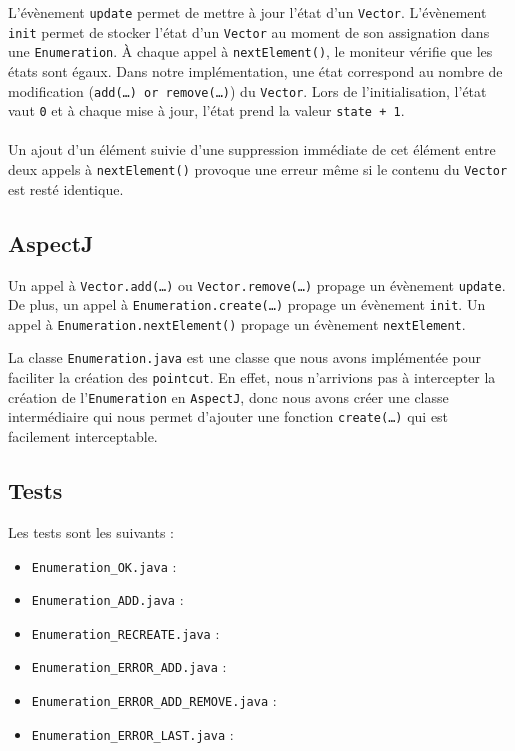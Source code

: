 \documentclass{article}
\begin{document}
L'évènement \texttt{update} permet de mettre à jour l'état d'un \texttt{Vector}.
L'évènement \texttt{init} permet de stocker l'état d'un \texttt{Vector} au
moment de son assignation dans une \texttt{Enumeration}. À chaque appel à
\texttt{nextElement()}, le moniteur vérifie que les états sont égaux. Dans notre
implémentation, une état correspond au nombre de modification
(\texttt{add(\ldots) or \texttt{remove(\ldots)}}) du \texttt{Vector}. Lors de
l'initialisation, l'état vaut \texttt{0} et à chaque mise à jour, l'état prend
la valeur \texttt{state + 1}.

\paragraph{\danger} Un ajout d'un élément suivie d'une suppression immédiate de
cet élément entre deux appels à \texttt{nextElement()} provoque une erreur même
si le contenu du \texttt{Vector} est resté identique.

\subsection{AspectJ}

Un appel à \texttt{Vector.add(\ldots)} ou \texttt{Vector.remove(\ldots)} propage
un évènement \texttt{update}. De plus, un appel à
\texttt{Enumeration.create(\ldots)} propage un évènement \texttt{init}. Un appel à \texttt{Enumeration.nextElement()}
propage un évènement \texttt{nextElement}.

\vspace{0.3cm}

La classe \texttt{Enumeration.java} est une classe que nous avons implémentée
pour faciliter la création des \texttt{pointcut}. En effet, nous n'arrivions pas
à intercepter la création de l'\texttt{Enumeration} en \texttt{AspectJ}, donc
nous avons créer une classe intermédiaire qui nous permet d'ajouter une fonction
\texttt{create(\ldots)} qui est facilement interceptable.

\subsection{Tests}

Les tests sont les suivants :

\begin{itemize}
  \item \texttt{Enumeration\_OK.java} : 
  \item \texttt{Enumeration\_ADD.java} : 
  \item \texttt{Enumeration\_RECREATE.java} :
  \item \texttt{Enumeration\_ERROR\_ADD.java} : 
  \item \texttt{Enumeration\_ERROR\_ADD\_REMOVE.java} : 
  \item \texttt{Enumeration\_ERROR\_LAST.java} : 
\end{itemize}
\end{document}
